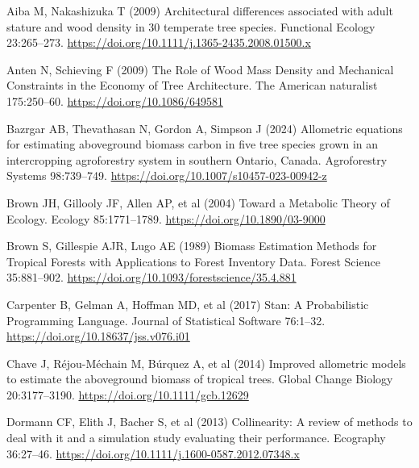 \documentclass[
  12pt,
  letterpaper,
  DIV=11,
  numbers=noendperiod]{scrartcl}
\newlength{\cslhangindent}
\newlength{\cslentryspacingunit} %
\newenvironment{CSLReferences}[2] %
 {%
  \setlength{\parindent}{0pt}
  \ifodd #1
  \let\oldpar\par
  \def\par{\hangindent=\cslhangindent\oldpar}
  \fi
  \setlength{\parskip}{#2\cslentryspacingunit}
 }%
 {}
\begin{document}
\hypertarget{refs}{}
\begin{CSLReferences}{1}{0}
\leavevmode{}%
Aiba M, Nakashizuka T (2009) Architectural differences associated with
adult stature and wood density in 30 temperate tree species. Functional
Ecology 23:265--273.
\url{https://doi.org/10.1111/j.1365-2435.2008.01500.x}

\leavevmode{}%
Anten N, Schieving F (2009) The {Role} of {Wood} {Mass} {Density} and
{Mechanical} {Constraints} in the {Economy} of {Tree} {Architecture}.
The American naturalist 175:250--60.
\url{https://doi.org/10.1086/649581}

\leavevmode{}%
Bazrgar AB, Thevathasan N, Gordon A, Simpson J (2024) Allometric
equations for estimating aboveground biomass carbon in five tree species
grown in an intercropping agroforestry system in southern {Ontario},
{Canada}. Agroforestry Systems 98:739--749.
\url{https://doi.org/10.1007/s10457-023-00942-z}

\leavevmode{}%
Brown JH, Gillooly JF, Allen AP, et al (2004) Toward a {Metabolic}
{Theory} of {Ecology}. Ecology 85:1771--1789.
\url{https://doi.org/10.1890/03-9000}

\leavevmode{}%
Brown S, Gillespie AJR, Lugo AE (1989) Biomass {Estimation} {Methods}
for {Tropical} {Forests} with {Applications} to {Forest} {Inventory}
{Data}. Forest Science 35:881--902.
\url{https://doi.org/10.1093/forestscience/35.4.881}

\leavevmode{}%
Carpenter B, Gelman A, Hoffman MD, et al (2017) Stan: {A}
{Probabilistic} {Programming} {Language}. Journal of Statistical
Software 76:1--32. \url{https://doi.org/10.18637/jss.v076.i01}

\leavevmode{}%
Chave J, Réjou-Méchain M, Búrquez A, et al (2014) Improved allometric
models to estimate the aboveground biomass of tropical trees. Global
Change Biology 20:3177--3190. \url{https://doi.org/10.1111/gcb.12629}

\leavevmode{}%
Dormann CF, Elith J, Bacher S, et al (2013) Collinearity: A review of
methods to deal with it and a simulation study evaluating their
performance. Ecography 36:27--46.
\url{https://doi.org/10.1111/j.1600-0587.2012.07348.x}


\end{CSLReferences}
\end{document}
